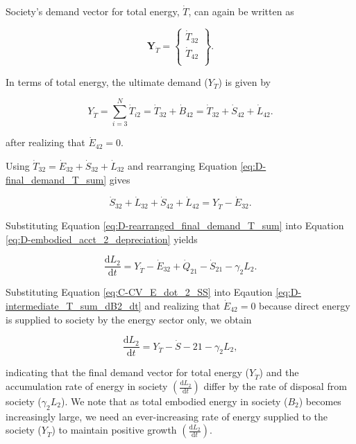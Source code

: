 \documentclass[authoryear,preprint,review,12pt]{elsarticle}
\renewcommand{\vec}[1]{\mathbf{#1}}
\begin{document}
Society's demand vector for total energy, $\dot{T}$, can again be written as 

\begin{equation} \label{eq:D-demand_vector_T_dot}
	\vec{Y}_{\dot{T}} = 	\begin{Bmatrix} 	\dot{T}_{32}	\\
																\dot{T}_{42}	\\
									\end{Bmatrix}.
\end{equation}

\noindent In terms of total energy, the ultimate demand ($Y_{\dot{T}}$) is given by 

\begin{equation} \label{eq:D-final_demand_T_sum}
	Y_{\dot{T}} = 	\sum_{i=3}^{N} \dot{T}_{i2} = \dot{T}_{32} + \dot{B}_{42} = \dot{T}_{32} + \dot{S}_{42} + \dot{L}_{42}.
\end{equation}

\noindent after realizing that $\dot{E}_{42} = 0$.

Using $\dot{T}_{32} = \dot{E}_{32} + \dot{S}_{32} + \dot{L}_{32}$ and rearranging Equation \ref{eq:D-final_demand_T_sum} gives

\begin{equation} \label{eq:D-rearranged_final_demand_T_sum}
	\dot{S}_{32} +\dot{L}_{32} + \dot{S}_{42} + \dot{L}_{42} = Y_{\dot{T}} - \dot{E}_{32}.
\end{equation}

\noindent Substituting Equation \ref{eq:D-rearranged_final_demand_T_sum} into Equation \ref{eq:D-embodied_acct_2_depreciation} yields

\begin{equation} \label{eq:D-intermediate_T_sum_dB2_dt}
	\frac{\mathrm{d}L_2}{\mathrm{d}t} = Y_{\dot{T}} - \dot{E}_{32} + \dot{Q}_{21} - \dot{S}_{21} - \gamma_2 L_2.
\end{equation}

Substituting Equation \ref{eq:C-CV_E_dot_2_SS} into Eqaution \ref{eq:D-intermediate_T_sum_dB2_dt} and realizing that $\dot{E}_{42} = 0$ because direct energy is supplied to society by the energy sector only, we obtain 

\begin{equation} \label{eq:D-compare_demand_and_accumulation}
	\frac{\mathrm{d}L_{2}}{\mathrm{d}t} = Y_{\dot{T}} - \dot{S}-{21} - \gamma_{2}L_{2},
\end{equation}

\noindent indicating that the final demand vector for total energy ($Y_{\dot{T}}$) and the accumulation rate of energy in society $\left(\frac{\mathrm{d}L_{2}}{\mathrm{d}t}\right)$ differ by the rate of disposal from society ($\gamma_{2}L_{2}$). We note that as total embodied energy in society ($B_{2}$) becomes increasingly large, we need an ever-increasing rate of energy supplied to the society ($Y_{\dot{T}}$) to maintain positive growth $\left(\frac{\mathrm{d}L_{2}}{\mathrm{d}t}\right)$. 
\end{document}
